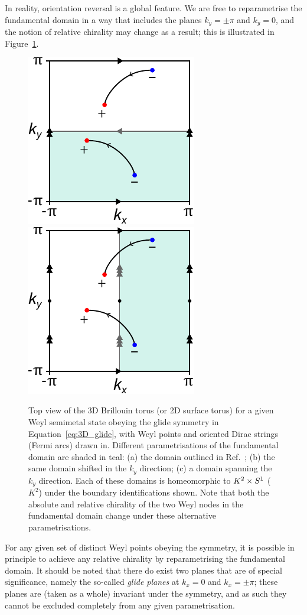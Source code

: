 In reality, orientation reversal is a global feature. We are free to reparametrise the fundamental domain in a way that includes the planes $k_y=\pm\pi$ and $k_y=0$, and the notion of relative chirality may change as a result; this is illustrated in Figure~\ref{fig:BZ_param}.
\begin{figure}[htb!]
	\centering
	 {\includegraphics[width=.3\textwidth]{Images/BZ_basic}}
	\hfil
	\hfil
	 {\includegraphics[width=.3\textwidth]{Images/BZ_right}}
	\caption{Top view of the 3D Brillouin torus (or 2D surface torus) for a given Weyl semimetal state obeying the glide symmetry in Equation~\eqref{eq:3D_glide}, with Weyl points and oriented Dirac strings (Fermi arcs) drawn in. Different parametrisations of the fundamental domain are shaded in teal: (a) the domain outlined in Ref.~\cite{Fonseca-Vaidya_nonorientable}; (b) the same domain shifted in the $k_y$ direction; (c) a domain spanning the $k_y$ direction. Each of these domains is homeomorphic to $K^2\times S^1$ ($K^2$) under the boundary identifications shown. Note that both the absolute and relative chirality of the two Weyl nodes in the fundamental domain change under these alternative parametrisations.}
	\label{fig:BZ_param}
\end{figure}
For any given set of distinct Weyl points obeying the symmetry, it is possible in principle to achieve any relative chirality by reparametrising the fundamental domain. It should be noted that there do exist two planes that are of special significance, namely the so-called \emph{glide planes} at $k_x = 0$ and $k_x = \pm\pi$; these planes are (taken as a whole) invariant under the symmetry, and as such they cannot be excluded completely from any given parametrisation.

